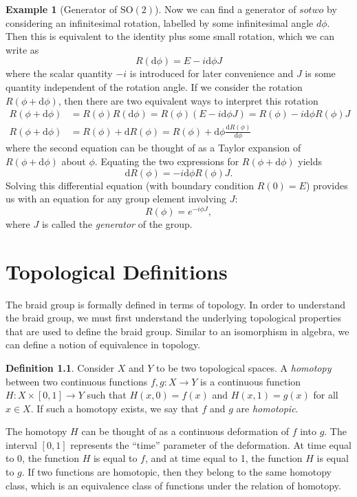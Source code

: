 \documentclass[12pt]{report}
\newcommand{\sotwo}{\textrm{SO}{(2)}}
\theoremstyle{definition}
\newtheorem{definition}{Definition}[chapter]
\newtheorem{example}{Example}[chapter]
\begin{document}
\begin{example}[Generator of $\sotwo$]
    Now we can find a generator of $sotwo$ by considering an infinitesimal rotation, labelled by some infinitesimal angle $d\phi$. Then this is equivalent to the identity plus some small rotation, which we can write as
    \begin{equation}
        R(\textrm{d}\phi) = E - i \textrm{d}\phi J
    \end{equation}
    where the scalar quantity $-i$ is introduced for later convenience and $J$ is some quantity independent of the rotation angle. If we consider the rotation $R(\phi + \textrm{d}\phi)$, then there are two equivalent ways to interpret this rotation
    \begin{align}
        R(\phi + \textrm{d}\phi) &= R(\phi)R(\textrm{d}\phi) = R(\phi)(E - i \textrm{d}\phi J) = R(\phi) - i \textrm{d}\phi R(\phi)J \\
        R(\phi + \textrm{d}\phi) &= R(\phi) + \textrm{d}R(\phi) = R(\phi) + \textrm{d}\phi\frac{\textrm{d}R(\phi)}{\textrm{d}\phi}
    \end{align}
    where the second equation can be thought of as a Taylor expansion of $R(\phi + \textrm{d}\phi)$ about $\phi$. Equating the two expressions for $R(\phi + \textrm{d}\phi)$ yields
    \begin{equation}
        \textrm{d}R(\phi) = -i\textrm{d}\phi R(\phi)J.
    \end{equation}
    Solving this differential equation (with boundary condition $R(0)=E$) provides us with an equation for any group element involving $J$:
    \begin{equation}
        R(\phi) = e^{-i\phi J},
    \end{equation}
    where $J$ is called the \textit{generator} of the group.
\end{example}

\chapter{Topological Definitions}
The braid group is formally defined in terms of topology. In order to understand the braid group, we must first understand the underlying topological properties that are used to define the braid group. Similar to an isomorphism in algebra, we can define a notion of equivalence in topology.

\begin{definition}
    Consider $X$ and $Y$ to be two topological spaces. A \textit{homotopy} between two continuous functions $f,g:X\to Y$ is a continuous function $H:X\times[0,1]\to Y$ such that $H(x,0)=f(x)$ and $H(x,1)=g(x)$ for all $x\in X$. If such a homotopy exists, we say that $f$ and $g$ are \textit{homotopic}.
\end{definition}
The homotopy $H$ can be thought of as a continuous deformation of $f$ into $g$. The interval $\left[ 0,1 \right]$ represents the ``time'' parameter of the deformation. At time equal to 0, the function $H$ is equal to $f$, and at time equal to 1, the function $H$ is equal to $g$. If two functions are homotopic, then they belong to the same homotopy class, which is an equivalence class of functions under the relation of homotopy.
\end{document}
